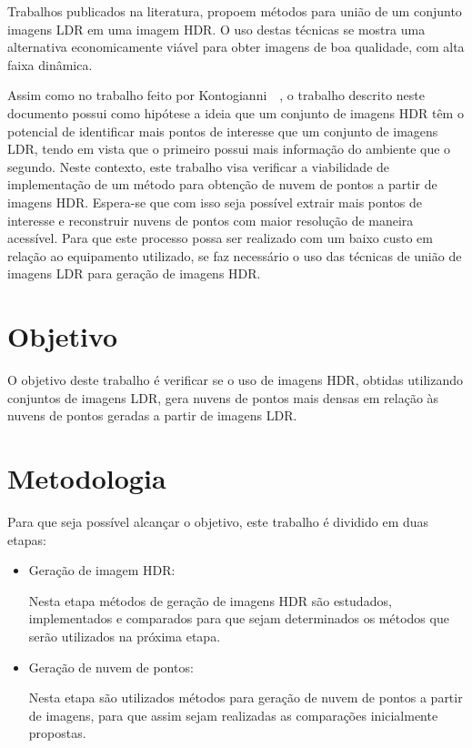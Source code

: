Trabalhos publicados na literatura, propoem métodos para união de um conjunto imagens LDR em uma imagem HDR. O uso destas técnicas se mostra uma alternativa economicamente viável para obter imagens de boa qualidade, com alta faixa dinâmica.


Assim como no trabalho feito por Kontogianni~\etal~\cite{hdr3d}, o trabalho descrito neste documento possui como hipótese a ideia que um conjunto de imagens HDR têm o potencial de identificar mais pontos de interesse que um conjunto de imagens LDR, tendo em vista que o primeiro possui mais informação do ambiente que o segundo. Neste contexto, este trabalho visa verificar a viabilidade de implementação de um método para obtenção de nuvem de pontos a partir de imagens HDR. Espera-se que com isso seja possível extrair mais pontos de interesse e reconstruir nuvens de pontos com maior resolução de maneira acessível. Para que este processo possa ser realizado com um baixo custo em relação ao equipamento utilizado, se faz necessário o uso das técnicas de união de imagens LDR para geração de imagens HDR.

\section{Objetivo} \label{introducaoObjetivo}

O objetivo deste trabalho é verificar se o uso de imagens HDR, obtidas utilizando conjuntos de imagens LDR, gera nuvens de pontos mais densas em relação às nuvens de pontos geradas a partir de imagens LDR.

\section{Metodologia} \label{introducaoMetodo}

Para que seja possível alcançar o objetivo, este trabalho é dividido em duas etapas:

\begin{itemize}
\item Geração de imagem HDR:

Nesta etapa métodos de geração de imagens HDR são estudados, implementados e comparados para que sejam determinados os métodos que serão utilizados na próxima etapa.
\item Geração de nuvem de pontos:

Nesta etapa são utilizados métodos para geração de nuvem de pontos a partir de imagens, para que assim sejam realizadas as comparações inicialmente propostas.
\end{itemize}
	